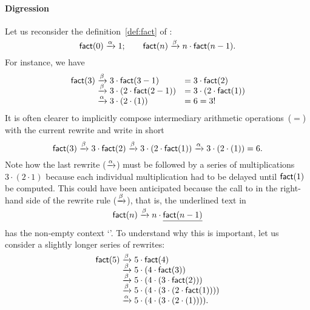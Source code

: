 \paragraph{Digression}

Let us reconsider the definition~\eqref{def:fact} of
 :
\begin{equation*}
\textsf{fact}(0) \xrightarrow{\smash{\alpha}} 1;\qquad
\textsf{fact}(n) \xrightarrow{\smash{\beta}} n \cdot \textsf{fact}(n-1).
\end{equation*}
For instance, we have
\begin{equation*}
\begin{array}{r@{\;}c@{\;}lc@{\;}l}
\fun{fact}(3) & \xrightarrow{\beta} & 3 \cdot \fun{fact}(3-1)
              & = & 3 \cdot \fun{fact}(2)\\
              & \xrightarrow{\smash[t]{\beta}} &
              3 \cdot (2 \cdot \fun{fact}(2-1))
              & = & 3 \cdot (2 \cdot \fun{fact}(1))\\
              & \xrightarrow{\smash[t]{\alpha}} &
                3 \cdot (2 \cdot (1)) & = & 6 = 3!
\end{array}
\end{equation*}
It is often clearer to implicitly compose intermediary arithmetic
operations~(\(=\)) with the current rewrite and write in short
\begin{equation*}
\textsf{fact}(3) \xrightarrow{\beta} 3 \cdot \textsf{fact}(2)
\xrightarrow{\smash[t]{\beta}} 3 \cdot (2 \cdot \textsf{fact}(1))
\xrightarrow{\smash[t]{\alpha}} 3 \cdot (2 \cdot (1)) = 6.
\end{equation*}
Note how the last rewrite (\(\xrightarrow{\smash[t]{\alpha}}\)) must
be followed by a series of multiplications~\(3 \cdot (2 \cdot 1)\)
because each individual multiplication had to be delayed until
\(\textsf{fact}(1)\) be computed. This could have been anticipated
because the call to  in the right\hyp{}hand side of the
rewrite rule (\(\xrightarrow{\smash[t]{\beta}}\)), that is, the
underlined text in
\begin{equation*}
\textsf{fact}(n) \xrightarrow{\smash[t]{\beta}} n \cdot \underline{\textsf{fact}(n-1)}
\end{equation*}
has the non\hyp{}empty context
`'. To understand why this is
important, let us consider a slightly longer series of
rewrites:\label{trace:fact_5}
\begin{equation*}
\begin{array}{r@{\;}c@{\;}l}
\fun{fact}(5)
& \smashedrightarrow{\beta} & 5 \cdot \fun{fact}(4)\\
& \smashedrightarrow{\beta} & 5 \cdot (4 \cdot \fun{fact}(3))\\
& \smashedrightarrow{\beta} & 5 \cdot (4 \cdot (3 \cdot \fun{fact}(2)))\\
& \smashedrightarrow{\beta} & 5 \cdot (4 \cdot (3 \cdot (2 \cdot
                              \fun{fact}(1))))\\
& \smashedrightarrow{\alpha} & 5 \cdot (4 \cdot (3 \cdot (2 \cdot
(1)))).
\end{array}
\end{equation*}
